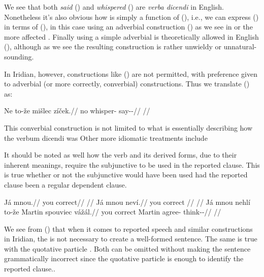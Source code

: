 We see that both \emph{said} () and \emph{whispered} () are \emph{verba dicendi} in English. Nonetheless it's also obvious how  is simply a function of (), i.e., we can express () in terms of (), in this case using an adverbial construction () as we see in  or the more affected . Finally using a simple adverbial is theoretically allowed in English (), although as we see the resulting construction is rather unwieldy or unnatural-sounding.

In Iridian, however, constructions like () are not permitted, with preference given to adverbial (or more correctly, converbial) constructions. Thus we translate () as:

\pex
\begingl
\gla Ne to-že mišlec zíček.//
\glb no  whisper-\Cv{} say-\Av{}-\Pf{}//
\glft {}//
\endgl
\xe


This converbial construction is not limited to what is essentially describing how the verbum dicendi was  Other more idiomatic treatments include


It should be noted as well how the verb  and its derived forms, due to their inherent meanings, require the subjunctive to be used in the reported clause. This is true whether or not the subjunctive would have been used had the reported clause been a regular dependent clause.


\pex
\a
\begingl
  \gla Já mnou.//
  \glb you correct//
  \glft {}//
\endgl
\a
\begingl
  \gla Já mnou neví.//
  \glb you correct //
  \glft {}//
\endgl
\a
\begingl
  \gla Já mnou nehlí to-že Martin spouviec vážál.//
  \glb you correct   Martin agree-\Cv{} think-\Av{}-\Cont{}//
  \glft {}//
\endgl
\xe



We see from () that when it comes to reported speech and similar constructions in Iridian, the  is not necessary to create a well-formed sentence. The same is true with the quotative particle . Both can be omitted without making the sentence grammatically incorrect since the quotative particle is enough to identify the reported clause..

